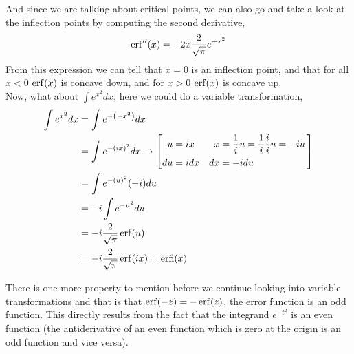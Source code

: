 And since we are talking about critical points, we can also go and take a look at the inflection points by computing the second
derivative,
$$
\operatorname{erf}^{\prime\prime}(x) = -2x \frac{2}{\sqrt{\pi}} e^{-x^2}
$$
From this expression we can tell that $x=0$ is an inflection point, and that for all $x<0$ $\operatorname{erf}(x)$ is concave down, and for $x>0$
$\operatorname{erf}(x)$ is concave up.
\\

Now, what about $\int e^{x^2} dx$, here we could do a variable transformation,
\begin{align*}
\int e^{x^2} dx &= \int e^{-\left(-x^2\right)} dx \\
& = \int e^{-(ix)^2} dx \rightarrow
\left[
    \begin{alignedat}{2}
        u  &= ix    \quad & x  &= \frac{1}{i}u = \frac{1}{i} \frac{i}{i} u = -iu \\
        du &= i dx  \quad & dx &= -i du
    \end{alignedat}\,
\right] \\
&= \int e^{-(u)^2} (-i) du \\
&= -i \int e^{-u^2} du \\
&= -i \frac{2}{\sqrt{\pi}} \operatorname{erf}(u) \\
&= -i \frac{2}{\sqrt{\pi}} \operatorname{erf}(ix) = \operatorname{erfi}(x)
\end{align*}

There is one more property to mention before we continue looking into variable transformations and that is that
$\operatorname{erf}(-z) = -\operatorname{erf}(z)$, the error function is an odd function.
This directly results from the fact that the integrand $e^{-t^2}$ is an even function
(the antiderivative of an even function which is zero at the origin is an odd function and vice versa).